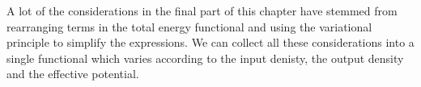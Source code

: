 A lot of the considerations in the final part of this chapter have stemmed from 
rearranging terms in the total energy functional and using the variational principle
to simplify the expressions. We can collect all these considerations into a single functional
which varies according to the input denisty, the output density and the effective potential.
%
%


